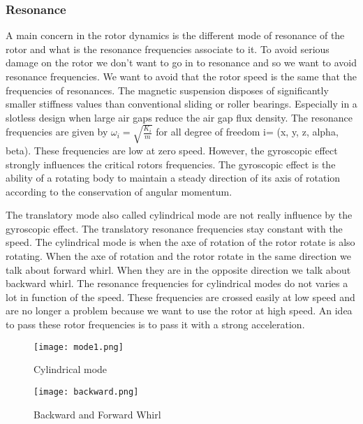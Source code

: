 \subsubsection{Resonance}
A main concern in the rotor dynamics is the different mode of resonance of the rotor and what is the resonance frequencies associate to it. To avoid serious damage on the rotor we don’t want to go in to resonance and so we want to avoid resonance frequencies. We want to avoid that the rotor speed is the same that the frequencies of resonances.
The magnetic suspension disposes of significantly smaller stiffness values than conventional sliding or roller bearings. Especially in a slotless design when large air gaps reduce the air gap flux density. The resonance frequencies are given by ${ \omega  }_{ i }=\sqrt { \frac { { K }_{ i } }{ m }  } $ for all degree of freedom i= (x, y, z, alpha, beta).
These frequencies are low at zero speed.
However, the gyroscopic effect strongly influences the critical rotors frequencies. The gyroscopic effect is the ability of a rotating body to maintain a steady direction of its axis of rotation according to the conservation of angular momentum.

The translatory mode also called cylindrical mode are not really influence by the gyroscopic effect. The translatory resonance frequencies stay constant with the speed.
The cylindrical mode is when the axe of rotation of the rotor rotate is also rotating. When the axe of rotation and the rotor rotate in the same direction we talk about forward whirl. When they are in the opposite direction we talk about backward whirl. The resonance frequencies for cylindrical modes do not varies a lot in function of the speed. These frequencies are crossed easily at low speed and are no longer a problem because we want to use the rotor at high speed. An idea to pass these rotor frequencies is to pass it with a strong acceleration.
\begin{figure}[H]
    \centering
    \texttt{[image: mode1.png]}
    \caption{Cylindrical mode}
    \label{cylindre}
\end{figure}

\begin{figure}[H]
    \centering
    \texttt{[image: backward.png]}
    \caption{Backward and Forward Whirl}
\end{figure}



